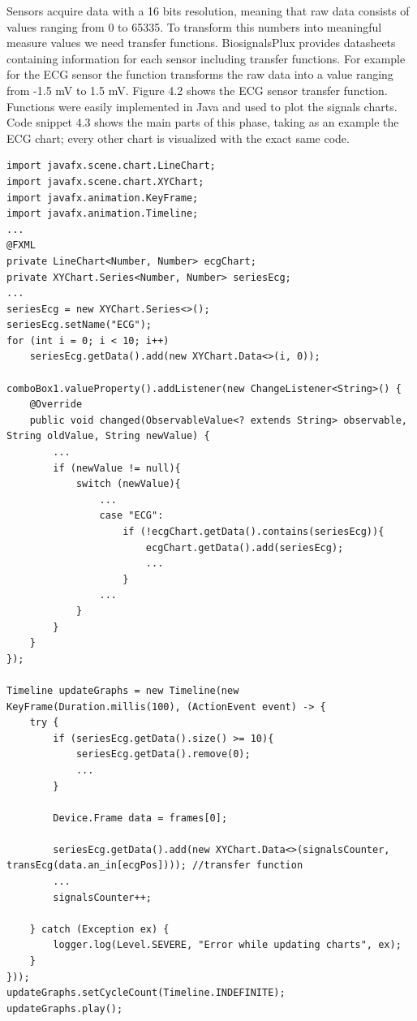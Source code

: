 \documentclass[binding=0.6cm,LaM]{sapthesis}
\begin{document}
Sensors acquire data with a 16 bits resolution, meaning that raw data consists of values ranging from 0 to 65335. To transform this numbers into meaningful measure values we need transfer functions. BiosignalsPlux provides datasheets containing information for each sensor including transfer functions. For example for the ECG sensor the function transforms the raw data into a value ranging from -1.5 mV to 1.5 mV. Figure 4.2 shows the ECG sensor transfer function.
Functions were easily implemented in Java and used to plot the signals charts. 
Code snippet 4.3 shows the main parts of this phase, taking as an example the ECG chart; every other chart is visualized with the exact same code. 
\\
\begin{lstlisting}[caption={Sensors data visualization}, captionpos=b]
import javafx.scene.chart.LineChart;
import javafx.scene.chart.XYChart;
import javafx.animation.KeyFrame;
import javafx.animation.Timeline;
...
@FXML
private LineChart<Number, Number> ecgChart;
private XYChart.Series<Number, Number> seriesEcg;
...
seriesEcg = new XYChart.Series<>();
seriesEcg.setName("ECG");
for (int i = 0; i < 10; i++)
	seriesEcg.getData().add(new XYChart.Data<>(i, 0));

comboBox1.valueProperty().addListener(new ChangeListener<String>() {
	@Override
    public void changed(ObservableValue<? extends String> observable, String oldValue, String newValue) {
    	...
    	if (newValue != null){
        	switch (newValue){
        		...
        		case "ECG":
                	if (!ecgChart.getData().contains(seriesEcg)){
                    	ecgChart.getData().add(seriesEcg);
                    	...
                    }
                ...
            }
        }
    }
});

Timeline updateGraphs = new Timeline(new KeyFrame(Duration.millis(100), (ActionEvent event) -> {
	try {
		if (seriesEcg.getData().size() >= 10){
			seriesEcg.getData().remove(0);
			...
		}
		
		Device.Frame data = frames[0];
		
		seriesEcg.getData().add(new XYChart.Data<>(signalsCounter, transEcg(data.an_in[ecgPos]))); //transfer function
		...
		signalsCounter++;

	} catch (Exception ex) {
		logger.log(Level.SEVERE, "Error while updating charts", ex);
	}
}));
updateGraphs.setCycleCount(Timeline.INDEFINITE);
updateGraphs.play();

\end{lstlisting}
\end{document}
